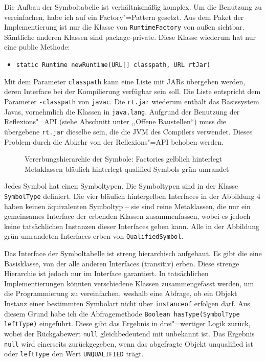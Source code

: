\documentclass[10pt,a4paper,ngerman,titlepage,tocindentauto]{scrartcl}
\begin{document}
			Die Aufbau der Symboltabelle ist verhältnismäßig komplex. Um die Benutzung zu vereinfachen, habe ich
			auf ein Factory"=Pattern gesetzt. Aus dem Paket der Implementierung ist nur die Klasse von \texttt{RuntimeFactory}
			von außen sichtbar. Sämtliche anderen Klassen sind package-private. Diese Klasse wiederum hat nur eine
			public Methode:
			\begin{itemize}
				\item \verb|static Runtime newRuntime(URL[] classpath, URL rtJar)|
			\end{itemize}
			Mit dem Parameter \texttt{classpath} kann eine Liste mit JARs übergeben werden, deren Interface bei der Kompilierung
			verfügbar sein soll. Die Liste entspricht dem Parameter \texttt{-classpath} von \texttt{javac}.
			Die \texttt{rt.jar} wiederum enthält das Basissystem Javas, vornehmlich die Klassen in \texttt{java.lang}.
			Aufgrund der Benutzung der Reflexions"=API (siehe Abschnitt unter ,,\hyperlink{Offene_Baustellen_Symboltabelle}{Offene Baustellen}``)
			muss die übergebene \texttt{rt.jar} dieselbe sein, die die JVM des Compilers verwendet.
			Dieses Problem durch die Abkehr von der Reflexions"=API behoben werden.
			
			\begin{wrapfigure}{R}{0.5\textwidth}
				\caption[Vererbungshierarchie der Symbole]{Vererbungshierarchie der Symbole: \newline
					Factories gelblich hinterlegt \newline
					Metaklassen bläulich hinterlegt \newline
					qualified Symbols grün umrandet}
			\end{wrapfigure}
			
			Jedes Symbol hat einen Symboltypen. Die Symboltypen sind in der Klasse \texttt{SymbolType} definiert.
			Die vier bläulich hintergelben Interfaces in der Abbildung 4 haben keinen äquivalenten Symboltyp -- sie sind
			reine Metaklassen, die nur ein gemeinsames Interface der erbenden Klassen zusammenfassen, wobei
			es jedoch keine tatsächlichen Instanzen dieser Interfaces geben kann. Alle in der Abbildung grün umrandeten
			Interfaces erben von \texttt{QualifiedSymbol}.
			
			Das Interface der Symboltabelle ist streng hierarchisch aufgebaut. Es gibt die eine Basisklasse, von der
			alle anderen Interfaces (transitiv) erben. Diese strenge Hierarchie ist jedoch nur im Interface
			garantiert. In tatsächlichen Implementierungen könnten verschiedene Klassen zusammengefasst werden, um
			die Programmierung zu vereinfachen, weshalb eine Abfrage, ob ein Objekt Instanz einer bestimmten Symbolart
			nicht über \texttt{instanceof} erfolgen darf. Aus diesem Grund habe ich die Abfragemethode
			\verb|Boolean hasType(SymbolType leftType)| eingeführt. Diese gibt das Ergebnis in drei"=wertiger Logik
			zurück, wobei der Rückgabewert \texttt{null} gleichbedeutend mit unbekannt ist. Das Ergebnis \texttt{null}
			wird einerseits zurückgegeben, wenn das abgefragte Objekt unqualified ist oder \texttt{leftType} den Wert
			\texttt{UNQUALIFIED} trägt.
			
\end{document}
